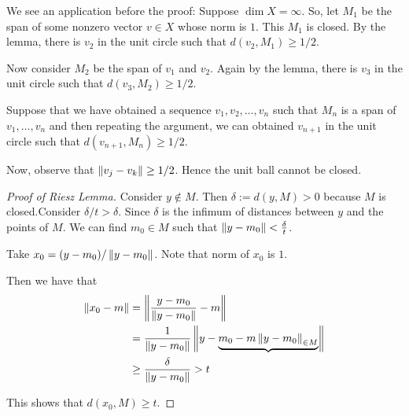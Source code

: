 We see an application before the proof:
Suppose $\dim X = \infty$. So, let $M_{1}$ be the span of some nonzero vector $v\in X$ whose norm is $1$. This $M_1$ is closed. By the lemma, there is $v_{2}$ in the unit circle such that $d\left( v_{2}, M_{1} \right) \ge 1/2$.

Now consider $M_{2}$ be the span of $v_{1}$ and $v_{2}$. Again by the lemma, there is $v_{3}$ in the unit circle such that $d \left( v_{3} , M_{2} \right) \ge 1/2$.

Suppose that we have obtained a sequence $v_{1}, v_{2}, \ldots, v_{n}$ such that $M_{n}$ is a span of $v_{1}, \ldots , v_{n}$ and then repeating the argument, we can obtained $v_{n+1}$ in the unit circle such that $d \left( v_{n+1} , M_{n} \right) \ge 1/2$.

Now, observe that $\left\lVert v_{j} - v_{k} \right\rVert \ge 1/2$. Hence the unit ball cannot be closed.

\begin{proof}[Proof of Riesz Lemma]
    Consider $y \not \in M$. Then $\delta := d(y, M) > 0$ because $M$ is closed.Consider $\delta /t > \delta$. Since $\delta$ is the infimum of distances between $y$ and the points of $M$. We can find $m_{0} \in M$ such that $\left\lVert y-m_{0}  \right\rVert< \frac{\delta}{t}$.

    Take $x_{0} = (y-m_{0})/\left\lVert y-m_{0} \right\rVert$. Note that norm of $x_{0}$ is $1$.

    Then we have that 
    \begin{align*}
	\left\lVert x_{0} - m \right\rVert &= \left\lVert \frac{y-m_{0}}{\left\lVert y-m_{0} \right\rVert} - m  \right\rVert \\
	&= \frac{1}{\left\lVert y-m_{0} \right\rVert} \left\lVert y-\underbrace{m_{0}- m \left\lVert y-m_{0} \right\rVert_{\in M}} \right\rVert \\
	    &\ge \frac{\delta}{ \left\lVert y-m_{0} \right\rVert} >t
    \end{align*}

This shows that $d \left( x_{0}, M \right) \ge t$.
\end{proof}

